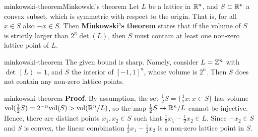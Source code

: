 \begin{topic}{minkowski-theorem}{Minkowski's theorem}
    Let $L$ be a lattice in $\mathbb{R}^n$, and $S \subset \mathbb{R}^n$ a convex subset, which is symmetric with respect to the origin. That is, for all $x \in S$ also $-x \in S$. Then \textbf{Minkowski's theorem} states that if the volume of $S$ is strictly larger than $2^n \det(L)$, then $S$ must contain at least one non-zero lattice point of $L$.
\end{topic}

\begin{example}{minkowski-theorem}
    The given bound is sharp. Namely, consider $L = \mathbb{Z}^n$ with $\det(L) = 1$, and $S$ the interior of $[-1, 1]^n$, whose volume is $2^n$. Then $S$ does not contain any non-zero lattice points.
\end{example}

\begin{example}{minkowski-theorem}
    \textbf{Proof}. By assumption, the set $\tfrac{1}{2} S = \{ \tfrac{1}{2} x : x \in S \}$ has volume $\textup{vol}(\tfrac{1}{2} S) = 2^{-n} \textup{vol}(S) > \textup{vol}(\mathbb{R}^n/L)$, so the map $\tfrac{1}{2} S \to \mathbb{R}^n / L$ cannot be injective. Hence, there are distinct points $x_1, x_2 \in S$ such that $\tfrac{1}{2} x_1 - \tfrac{1}{2} x_2 \in L$. Since $-x_2 \in S$ and $S$ is convex, the linear combination $\tfrac{1}{2} x_1 - \tfrac{1}{2} x_2$ is a non-zero lattice point in $S$.
\end{example}
